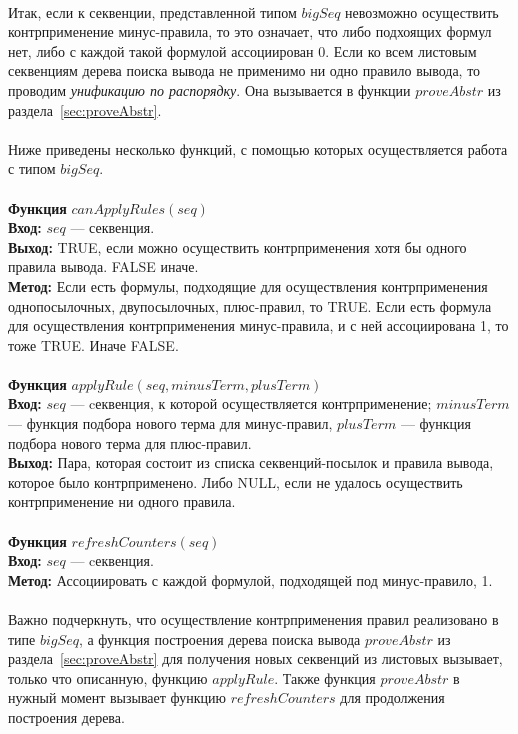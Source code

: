 \documentclass{cw1}
\begin{document}
\paragraph{}
Итак, если к секвенции, представленной типом $bigSeq$ невозможно осуществить контрприменение
минус-правила, то это означает, что либо подхоящих формул нет, либо с каждой такой формулой
ассоциирован 0. Если ко всем листовым секвенциям дерева поиска вывода не применимо ни
одно правило вывода, то проводим \textit{унификацию по распорядку}. Она
вызывается в функции $proveAbstr$ из раздела~\ref{sec:proveAbstr}.      
\paragraph{}
Ниже приведены несколько функций, с помощью которых осуществляется работа с типом $bigSeq$.\\
\qquad \\
\textbf{Функция} $can\!ApplyRules(seq)$\\
\textbf{Вход:} $seq$ --- секвенция.\\
\textbf{Выход:} TRUE, если можно осуществить контрприменения хотя бы одного правила вывода. FALSE
иначе.\\
\textbf{Метод:} Если есть формулы, подходящие для осуществления контрприменения однопосылочных,
двупосылочных, плюс-правил, то TRUE. Если есть формула для осуществления контрприменения
минус-правила, и с ней ассоциирована 1, то тоже TRUE. Иначе FALSE.\\
\qquad \\
\textbf{Функция} $apply\!Rule(seq, minusT\!erm, plusT\!erm)$\\
\textbf{Вход:} $seq$ --- cеквенция, к которой осуществляется контрприменение; $minusTerm$ --- функция подбора нового терма
для минус-правил, $plusTerm$ --- функция подбора нового терма для плюс-правил.\\
\textbf{Выход:} Пара, которая состоит из списка секвенций-посылок и правила вывода,
которое было контрприменено. Либо NULL, если не удалось осуществить контрприменение
ни одного правила.\\
\qquad \\
\textbf{Функция} $re\!f\!reshCounters(seq)$\\
\textbf{Вход:} $seq$ --- cеквенция.\\
\textbf{Метод:} Ассоциировать с каждой формулой, подходящей под минус-правило, 1.

\paragraph{}
Важно подчеркнуть, что осуществление контрприменения правил реализовано в типе $bigSeq$, а
функция построения дерева поиска вывода $proveAbstr$ из раздела~\ref{sec:proveAbstr} для получения новых секвенций
из листовых вызывает, только что описанную, функцию $applyRule$. Также функция $proveAbstr$ в нужный
момент вызывает функцию $refreshCounters$ для продолжения построения дерева.
\end{document}
